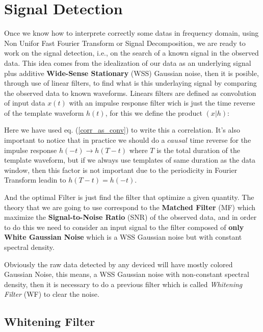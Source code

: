 \section{Signal Detection}{\label{sec:signalDetect}}
\newp Once we know how to interprete correctly some datas in frequency domain, using Non Unifor Fast Fourier Transform or Signal Decomposition, we are ready to work on the signal detection, i.e., on the search of a known signal in the observed data. This idea comes from the idealization of our data as an underlying signal plus additive \textbf{Wide-Sense Stationary} (WSS) Gaussian noise, then it is posible, through use of linear filters, to find what is this underlaying signal by comparing the observed data to known waveforms. Linears filters are defined as convolution of input data $x(t)$ with an impulse response filter wich is just the time reverse of the template waveform $h(t)$, for this we define the product $(x|h)$:


\newp Here we have used eq. (\ref{corr_as_conv}) to write this a correlation. It's also important to notice that in practice we should do a $causal$ time reverse for the impulse response $h(-t) \longrightarrow h(T-t)$ where $T$ is the total duration of the template waveform, but if we always use templates of same duration as the data window, then this factor is not important due to the periodicity in Fourier Transform leadin to $h(T-t)=h(-t)$.

\newp And the optimal Filter is just find the filter that optimize a given quantity. The theory that we are going to use correspond to the \textbf{Matched Filter} (MF) which maximize the \textbf{Signal-to-Noise Ratio} (SNR) of the observed data, and in order to do this we need to consider an input signal to the filter composed of \textbf{only White Gaussian Noise} which is a WSS Gaussian noise but with constant spectral density.

\newp Obviously the raw data detected by any deviced will have mostly colored Gaussian Noise, this means, a WSS Gaussian noise with non-constant spectral density, then it is necessary to do a previous filter which is called \textit{Whitening Filter} (WF) to clear the noise.

\subsection{Whitening Filter}{\label{sec:signalDetect::ssec:WF}}

